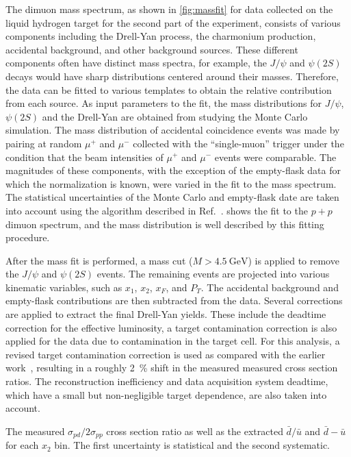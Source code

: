 \documentclass[reprint,aps,unsortedaddress,superscriptaddress,prl,floatfix,showpacs,linenumbers]{revtex4-2}
\begin{document}
The dimuon mass spectrum, as shown in \cref{fig:massfit} for data collected
on the liquid hydrogen target for the second part of the experiment, consists
of various components including the Drell-Yan process, the charmonium
production, accidental background, and other background sources.
These different components often have distinct mass spectra, for example, the $J/\psi$
and $\psi\left(2S\right)$ decays would have sharp distributions centered around their masses.
Therefore, the data can be fitted to various templates to obtain
the relative contribution from each source.
As input parameters to the fit, the mass distributions for $J/\psi$, $\psi\left(2S\right)$
and the Drell-Yan are obtained from studying the Monte Carlo simulation. %
The mass distribution of accidental coincidence events was made by pairing at random $\mu^+$ and $\mu^-$ collected with the ``single-muon'' trigger
under the condition that the beam intensities of $\mu^+$ and $\mu^-$ events were comparable.
The magnitudes of these components,
with the exception of the empty-flask data for which the normalization is known,
were varied in the fit to the mass spectrum.
The statistical uncertainties of the Monte Carlo and empty-flask date are taken into account using the algorithm described in Ref.~\cite{barlow1993}.
 shows the fit to the $p+p$ dimuon spectrum,
and the mass distribution is well described by this fitting procedure.

After the mass fit is performed,
a mass cut ($M>\SI{4.5}{\GeV}$) is applied to remove the $J/\psi$ and $\psi\left(2S\right)$ events.
The remaining events are projected into various kinematic variables, such as $x_1$, $x_2$, $x_F$, and $P_T$.
The accidental background and empty-flask contributions are then subtracted from the data.
Several corrections are applied to extract the final Drell-Yan yields.
These include the deadtime correction for the effective luminosity,
a target contamination correction is also applied for the  data due to  contamination in the target cell.
For this analysis,
a revised target contamination correction is used as compared with the earlier work~\cite{dove2021,dove2023},
resulting in a roughly \SI{2}{\percent} shift in the measured measured cross section ratios.
The reconstruction inefficiency and data acquisition system deadtime, which have a small but non-negligible target dependence,
are also taken into account.

\begin{table}[htbp!]
	\centering
	\caption{The measured $\sigma_{pd}/2\sigma_{pp}$ cross section ratio as well
		as the extracted $\bar{d}/\bar{u}$ and $\bar{d}-\bar{u}$ for each $x_{2}$ bin.
		The first uncertainty is statistical and the second systematic.}
	\label{tab:dbarubar}
	\begin{adjustbox}{max width=\textwidth}
		
	\end{adjustbox}
\end{table}
\end{document}
